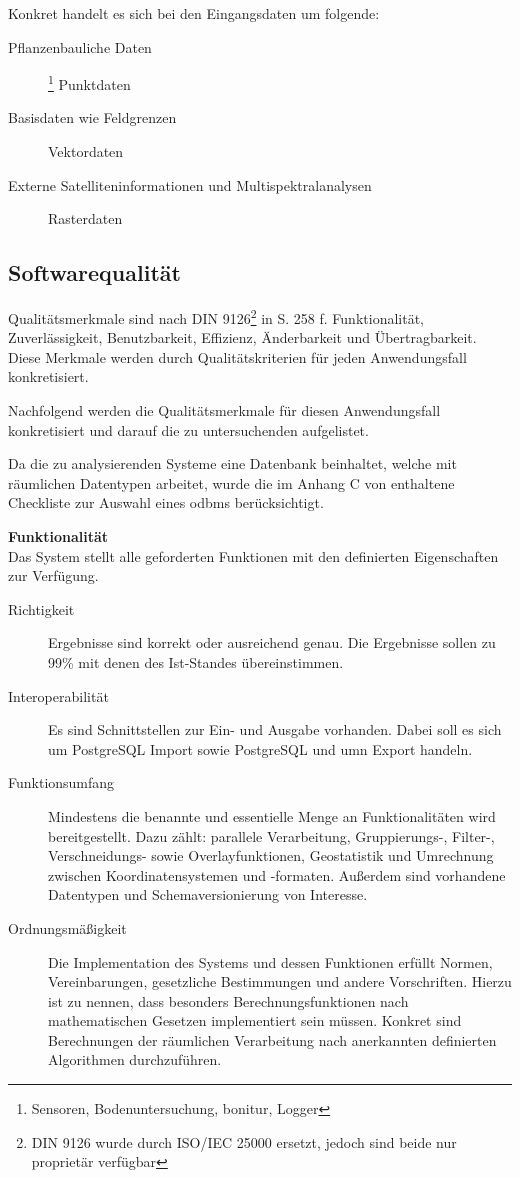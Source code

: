 Konkret handelt es sich bei den Eingangsdaten um folgende:
\begin{description}
\item[Pflanzenbauliche Daten]\footnote{Sensoren, Bodenuntersuchung, \Gls{bonitur}, Logger} Punktdaten
\item[Basisdaten wie Feldgrenzen] Vektordaten
\item[Externe Satelliteninformationen und Multispektralanalysen] Rasterdaten
\end{description}

\subsection{Softwarequalität}
\label{softwarequalität}
Qualitätsmerkmale sind nach DIN 9126\footnote{DIN 9126 wurde durch ISO/IEC 25000 ersetzt, jedoch sind beide nur proprietär verfügbar} in \cite{book:lehrbuchsoftware} S. 258 f. Funktionalität, Zuverlässigkeit, Benutzbarkeit, Effizienz, Änderbarkeit und Übertragbarkeit.
Diese Merkmale werden durch Qualitätskriterien für jeden Anwendungsfall konkretisiert.


Nachfolgend werden die Qualitätsmerkmale für diesen Anwendungsfall konkretisiert und darauf die zu untersuchenden aufgelistet.


Da die zu analysierenden Systeme eine Datenbank beinhaltet, welche mit räumlichen Datentypen arbeitet, wurde die im Anhang C von \cite{book:objdbs} enthaltene Checkliste zur Auswahl eines \Gls{odbms} berücksichtigt.

\textbf{Funktionalität}\\
Das System stellt alle geforderten Funktionen mit den definierten Eigenschaften zur Verfügung.
\begin{description}
\item[Richtigkeit] Ergebnisse sind korrekt oder ausreichend genau. Die Ergebnisse sollen zu 99\% mit denen des Ist-Standes übereinstimmen.
\item[Interoperabilität] Es sind Schnittstellen zur Ein- und Ausgabe vorhanden. Dabei soll es sich um PostgreSQL Import sowie PostgreSQL und \Gls{umn} Export handeln.
\item[Funktionsumfang] Mindestens die benannte und essentielle Menge an Funktionalitäten wird bereitgestellt. Dazu zählt:
parallele Verarbeitung, Gruppierungs-, Filter-, Verschneidungs- sowie Overlayfunktionen, Geostatistik und Umrechnung zwischen Koordinatensystemen und -formaten. Außerdem sind vorhandene Datentypen und Schemaversionierung von Interesse.
\item[Ordnungsmäßigkeit] Die Implementation des Systems und dessen Funktionen erfüllt Normen, Vereinbarungen, gesetzliche Bestimmungen und andere Vorschriften. Hierzu ist zu nennen, dass besonders Berechnungsfunktionen nach mathematischen Gesetzen implementiert sein müssen. Konkret sind Berechnungen der räumlichen Verarbeitung nach anerkannten definierten Algorithmen durchzuführen.
\end{description}



